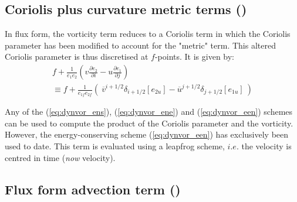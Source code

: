 \documentclass[../tex_main/NEMO_manual]{subfiles}
\begin{document}
\subsection{Coriolis plus curvature metric terms (\protect{}) }
\label{subsec:DYN_cor_flux}

In flux form, the vorticity term reduces to a Coriolis term in which the Coriolis 
parameter has been modified to account for the "metric" term. This altered 
Coriolis parameter is thus discretised at $f$-points. It is given by: 
\begin{multline} \label{eq:dyncor_metric}
f+\frac{1}{e_1 e_2 }\left( {v\frac{\partial e_2 }{\partial i}  -  u\frac{\partial e_1 }{\partial j}} \right)  \\
   \equiv   f + \frac{1}{e_{1f} e_{2f} } \left( { \ \overline v ^{i+1/2}\delta _{i+1/2} \left[ {e_{2u} } \right]  
                                                                 -  \overline u ^{j+1/2}\delta _{j+1/2} \left[ {e_{1u} } \right]  }  \ \right)
\end{multline} 

Any of the (\autoref{eq:dynvor_ens}), (\autoref{eq:dynvor_ene}) and (\autoref{eq:dynvor_een}) 
schemes can be used to compute the product of the Coriolis parameter and the 
vorticity. However, the energy-conserving scheme (\autoref{eq:dynvor_een}) has 
exclusively been used to date. This term is evaluated using a leapfrog scheme, 
$i.e.$ the velocity is centred in time (\textit{now} velocity).

\subsection{Flux form advection term (\protect{}) }
\label{subsec:DYN_adv_flux}
\end{document}
